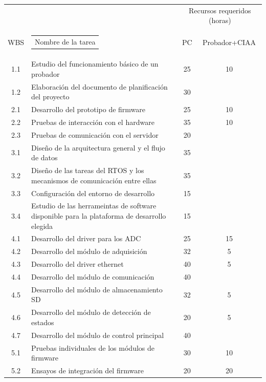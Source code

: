\documentclass[11pt]{charter}
\begin{document}
\begin{table}[H]
\label{tab:recursos}
\centering
\begin{tabularx}{\linewidth}{@{}|c|X|c|c|@{}}
\hline
\cellcolor[HTML]{C0C0C0} & \cellcolor[HTML]{C0C0C0} & \multicolumn{2}{c|}{\cellcolor[HTML]{C0C0C0}Recursos requeridos (horas)} \\ \cline{3-4} 
\multirow{-2}{*}{\cellcolor[HTML]{C0C0C0}WBS} & \multirow{-2}{*}{\cellcolor[HTML]{C0C0C0}\begin{tabular}[c]{@{}c@{}}Nombre de la tarea\end{tabular}} & PC & Probador+CIAA \\ \hline
 1.1 & Estudio del funcionamiento básico de un probador & 25 & 10 \\ \hline
 1.2 & Elaboración del documento de planificación del proyecto & 30 & \\ \hline
 2.1 & Desarrollo del prototipo de firmware & 25 & 10 \\ \hline
 2.2 & Pruebas de interacción con el hardware & 35 & 10\\ \hline
 2.3 & Pruebas de comunicación con el servidor & 20 & \\ \hline
 3.1 & Diseño de la arquitectura general y el flujo de datos & 35 & \\ \hline
 3.2 & Diseño de las tareas del RTOS y los mecanismos de comunicación entre ellas & 35 & \\ \hline
 3.3 & Configuración del entorno de desarrollo & 15 & \\ \hline
 3.4 & Estudio de las herrameintas de software disponible para la plataforma de desarrollo elegida & 15 & \\ \hline
 4.1 & Desarrollo del driver para los ADC & 25 & 15 \\ \hline
 4.2 & Desarrollo del módulo de adquisición & 32 & 5 \\ \hline
 4.3 & Desarrollo del driver ethernet & 40 & 5 \\ \hline
 4.4 & Desarrollo del módulo de comunicación & 40 & \\ \hline
 4.5 & Desarrollo del módulo de almacenamiento SD & 32 & 5 \\ \hline
 4.6 & Desarrollo del módulo de detección de estados & 20 & 5 \\ \hline
 4.7 & Desarrollo del módulo de control principal & 40 & \\ \hline
 5.1 & Pruebas individuales de los módulos de firmware & 30 & 10 \\ \hline
 5.2 & Ensayos de integración del firmware & 20 & 20 \\ \hline

\end{tabularx}
\end{table}
\end{document}
